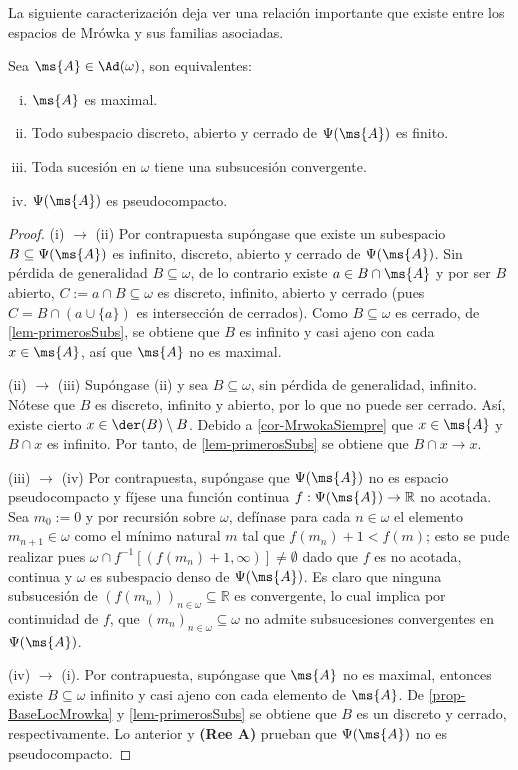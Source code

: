 	La siguiente caracterización deja ver una relación importante que existe entre los espacios de Mrówka y sus familias asociadas.
	
	\begin{proposicion}\label{prop-tra-pseudoCaract}
		Sea $\ms{A} \in \Ad(\omega)$, son equivalentes:
		\begin{enumerate}[i)]
			\item $\ms{A}$ es maximal.
			\item Todo subespacio discreto, abierto y cerrado de $\Psi(\ms{A})$ es finito.
			\item Toda sucesión en $\omega$ tiene una subsucesión convergente.
			\item $\Psi(\ms{A})$ es pseudocompacto.
		\end{enumerate}
	\end{proposicion}
	
	\begin{proof} 
		(i) $\rightarrow$ (ii) Por contrapuesta supóngase que existe un subespacio $B \subseteq \Psi(\ms{A})$ es infinito, discreto, abierto y cerrado de $\Psi(\ms{A})$. Sin pérdida de generalidad $B \subseteq \omega$, de lo contrario existe $a \in B \cap \ms{A}$ y por ser $B$ abierto, $C:=a \cap B \subseteq \omega$ es discreto, infinito, abierto y cerrado (pues $C=B \cap (a \cup \{a\})$ es intersección de cerrados). Como $B \subseteq \omega$ es cerrado, de \ref{lem-primerosSubs}, se obtiene que $B$ es infinito y casi ajeno con cada $x \in \ms{A}$, así que $\ms{A}$ no es maximal.
	
		(ii) $\rightarrow$ (iii) Supóngase (ii) y sea $B \subseteq \omega$, sin pérdida de generalidad, infinito. Nótese que $B$ es discreto, infinito y abierto, por lo que no puede ser cerrado. Así, existe cierto $x \in \der(B) \setminus B$. Debido a \ref{cor-MrwokaSiempre} que $x \in \ms{A}$ y $B \cap x$ es infinito. Por tanto, de \ref{lem-primerosSubs} se obtiene que $B \cap x \to x$.
		
		(iii) $\rightarrow$ (iv) Por contrapuesta, supóngase que $\Psi(\ms{A})$ no es espacio pseudocompacto y fíjese una función continua $f:\Psi(\ms{A}) \to \mathbb{R}$ no acotada. Sea $m_0:=0$ y por recursión sobre $\omega$, defínase para cada $n \in \omega$ el elemento $m_{n+1} \in \omega$ como el mínimo natural $m$ tal que $f(m_n)+1<f(m)$; esto se pude realizar pues $\omega \cap f^{-1}[(f(m_n)+1,\infty)] \neq \emptyset$ dado que $f$ es no acotada, continua y $\omega$ es subespacio denso de $\Psi(\ms{A})$. Es claro que ninguna subsucesión de $(f(m_n))_{n\in \omega} \subseteq \mathbb{R}$ es convergente, lo cual implica por continuidad de $f$, que $(m_n)_{n \in \omega} \subseteq \omega$ no admite subsucesiones convergentes en $\Psi(\ms{A})$.
		
		(iv) $\rightarrow$ (i). Por contrapuesta, supóngase que $\ms{A}$ no es maximal, entonces existe $B \subseteq \omega$ infinito y casi ajeno con cada elemento de $\ms{A}$. De \ref{prop-BaseLocMrowka} y \ref{lem-primerosSubs} se obtiene que $B$ es un discreto y cerrado, respectivamente. Lo anterior y \textbf{(Ree A)} prueban que $\Psi(\ms{A})$ no es pseudocompacto.
	\end{proof}
		
